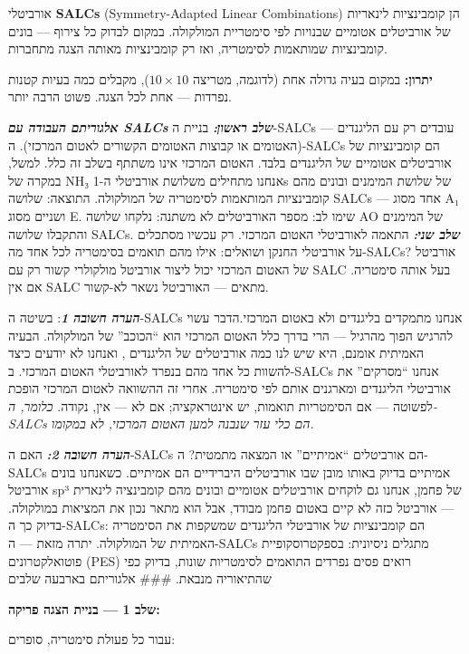 \documentclass[
  hebrew,
  letterpaper,
  DIV=11,
  numbers=noendperiod]{scrreprt}
\begin{document}
אורביטלי \textbf{SALCs} (Symmetry-Adapted Linear Combinations) הן
קומבינציות לינאריות של אורביטלים אטומיים שבנויות לפי סימטריית המולקולה.
במקום לבדוק כל צירוף --- בונים קומבינציות שמותאמות לסימטריה, ואז רק
קומבינציות מאותה הצגה מתחברות.

\textbf{יתרון:} במקום בעיה גדולה אחת (לדוגמה, מטריצה \(10 \times 10\)),
מקבלים כמה בעיות קטנות נפרדות --- אחת לכל הצגה. פשוט הרבה יותר.

\textbf{\emph{אלגוריתם העבודה עם SALCs}} \textbf{\emph{שלב ראשון:}}
בניית ה-SALCs --- עובדים רק עם הליגנדים (האטומים או קבוצות האטומים
הקשורים לאטום המרכזי). ה-SALCs הם קומבינציות של אורביטלים אטומיים של
הליגנדים בלבד. האטום המרכזי אינו משתתף בשלב זה כלל. למשל, במקרה של NH₃
אנחנו מתחילים משלושת אורביטלי ה-1s של שלושת המימנים ובונים מהם
קומבינציות המותאמות לסימטריה של המולקולה. התוצאה: שלושה SALCs --- אחד
מסוג A₁ ושניים מסוג E. שימו לב: מספר האורביטלים לא משתנה: נלקחו שלושה AO
של המימנים והתקבלו שלושה SALCs. \textbf{\emph{שלב שני:}} התאמה לאורביטלי
האטום המרכזי. רק עכשיו מסתכלים על אורביטלי החנקן ושואלים: אילו מהם
תואמים בסימטריה לכל אחד מה-SALCs? אורביטל של האטום המרכזי יכול ליצור
אורביטל מולקולרי קשור רק עם SALC בעל אותה סימטריה. אם אין SALC מתאים ---
האורביטל נשאר לא-קשור.

\textbf{\emph{הערה חשובה 1}}: בשיטה ה-SALCs אנחנו מתמקדים בליגנדים ולא
באטום המרכזי.הדבר עשוי להרגיש הפוך מהרגיל --- הרי בדרך כלל האטום המרכזי
הוא ``הכוכב'' של המולקולה. הבעיה האמיתית אומנם, היא שיש לנו כמה
אורביטלים של הליגנדים , ואנחנו לא יודעים כיצד להשוות כל אחד מהם בנפרד
לאורביטלי האטום המרכזי. ב-SALCs אנחנו ``מסרקים'' את אורביטלי הליגנדים
ומארגנים אותם לפי סימטריה. אחרי זה ההשוואה לאטום המרכזי הופכת לפשוטה ---
אם הסימטריות תואמות, יש אינטראקציה; אם לא --- אין, נקודה. \emph{כלומר,
ה-SALCs הם כלי עזר שנבנה למען האטום המרכזי, לא במקומו.}

\textbf{\emph{הערה חשובה 2:}} האם ה-SALCs הם אורביטלים ``אמיתיים'' או
המצאה מתמטית? ה-SALCs אמיתיים בדיוק באותו מובן שבו אורביטלים היברידיים
הם אמיתיים. כשאנחנו בונים אורביטל sp³ של פחמן, אנחנו גם לוקחים אורביטלים
אטומיים ובונים מהם קומבינציה לינארית --- אורביטל כזה לא קיים באטום פחמן
מבודד, אבל הוא מתאר נכון את המציאות במולקולה. בדיוק כך ה-SALCs: הם
קומבינציות של אורביטלי הליגנדים שמשקפות את הסימטריה האמיתית של המולקולה.
יתרה מזאת --- ה-SALCs מתגלים ניסיונית: בספקטרוסקופיית פוטואלקטרונים
(PES) רואים פסים נפרדים התואמים לסימטריות שונות, בדיוק כפי שהתיאוריה
מנבאת. \#\#\# אלגוריתם בארבעה שלבים

\textbf{שלב 1 --- בניית הצגה פריקה:}

עבור כל פעולת סימטריה, סופרים:
\end{document}
